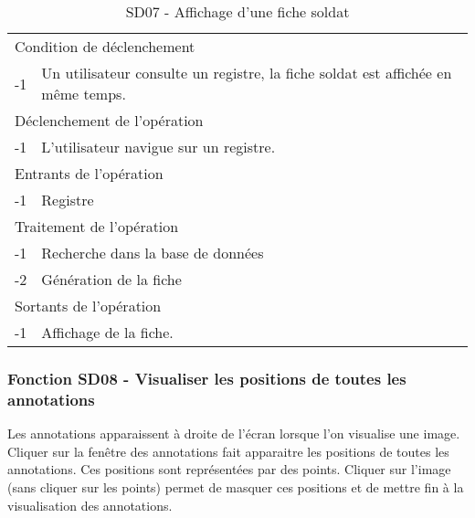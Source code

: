 \documentclass[a4paper]{article}
\begin{document}
\begin{table}[H]
  \centering
   \small
	\begin{tabular}{|c|p{12cm}|}
   		\hline
   			\rowcolor{lightgray}\multicolumn{2}{|c|}{\textbf{SD07 - Affichage d'une fiche soldat}} \\
   		\hline
   			\multicolumn{2}{|l|}{Condition de d\'eclenchement} \\
   		\hline
   		-1 & Un utilisateur consulte un registre, la fiche soldat est affich\'ee en m\^eme temps. \\
   		\hline
   			\multicolumn{2}{|l|}{D\'eclenchement de l'op\'eration} \\
   		\hline
   			-1 & L'utilisateur navigue sur un registre. \\
   		\hline
   			\multicolumn{2}{|l|}{Entrants de l'op\'eration} \\
   		\hline
   			-1 & Registre \\
   		\hline
   			\multicolumn{2}{|l|}{Traitement de l'op\'eration} \\
  		\hline
   			-1 & Recherche dans la base de donn\'ees \\
            -2 & G\'en\'eration de la fiche \\
   		\hline
   			\multicolumn{2}{|l|}{Sortants de l'op\'eration} \\
   		\hline
   			-1 & Affichage de la fiche. \\
   		\hline
	\end{tabular}
  \caption{SD07 - Affichage d'une fiche soldat}
  \normalsize
  \label{tab:affichage_fiche_soldat}
\end{table}


\subsubsection{Fonction SD08 - Visualiser les positions de toutes les annotations}
Les annotations apparaissent à droite de l’écran lorsque l’on visualise une image. Cliquer sur la fenêtre des annotations fait apparaitre les positions de toutes les annotations. Ces positions sont représentées par des points. Cliquer sur l’image (sans cliquer sur les points) permet de masquer ces positions et de mettre fin à la visualisation des annotations.\\
\end{document}
